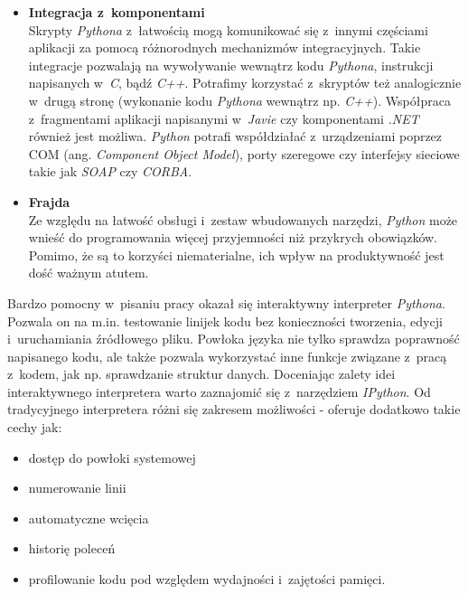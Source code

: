 \documentclass[a4paper,12pt,oneside]{mwrep}  %
\begin{document}
\begin{itemize}
\item \textbf{Integracja z~komponentami}\\
Skrypty \emph{Pythona} z~łatwością mogą komunikować się z~innymi częściami aplikacji za pomocą różnorodnych mechanizmów integracyjnych. Takie integracje pozwalają na wywoływanie wewnątrz kodu \emph{Pythona}, instrukcji napisanych w~\emph{C}, bądź \emph{C++}. Potrafimy korzystać z~skryptów też analogicznie w~drugą stronę (wykonanie kodu \emph{Pythona} wewnątrz np. \emph{C++}). Współpraca z~fragmentami aplikacji napisanymi w~\emph{Javie} czy komponentami \emph{.NET} również jest możliwa. \emph{Python} potrafi współdziałać z~urządzeniami poprzez COM (ang. \emph{Component Object Model}), porty szeregowe czy interfejsy sieciowe takie jak \emph{SOAP} czy \emph{CORBA}.

\item \textbf{Frajda}\\
Ze względu na łatwość obsługi i~zestaw wbudowanych narzędzi, \emph{Python} może wnieść do programowania więcej przyjemności niż przykrych obowiązków. Pomimo, że są to korzyści niematerialne, ich wpływ na produktywność jest dość ważnym atutem.

\end{itemize}

Bardzo pomocny w~pisaniu pracy okazał się interaktywny interpreter \emph{Pythona}. Pozwala on na m.in. testowanie linijek kodu bez konieczności tworzenia, edycji i~uruchamiania źródłowego pliku. Powłoka języka nie tylko sprawdza poprawność napisanego kodu, ale także pozwala wykorzystać inne funkcje związane z~pracą z~kodem, jak np. sprawdzanie struktur danych. Doceniając zalety idei interaktywnego interpretera warto zaznajomić się z~narzędziem \emph{IPython}. Od tradycyjnego interpretera różni się zakresem możliwości - oferuje dodatkowo takie cechy jak: %
\begin{itemize}
\item dostęp do powłoki systemowej
\item numerowanie linii
\item automatyczne wcięcia
\item historię poleceń
\item profilowanie kodu pod względem wydajności i~zajętości pamięci.
\end{itemize}
\end{document}

